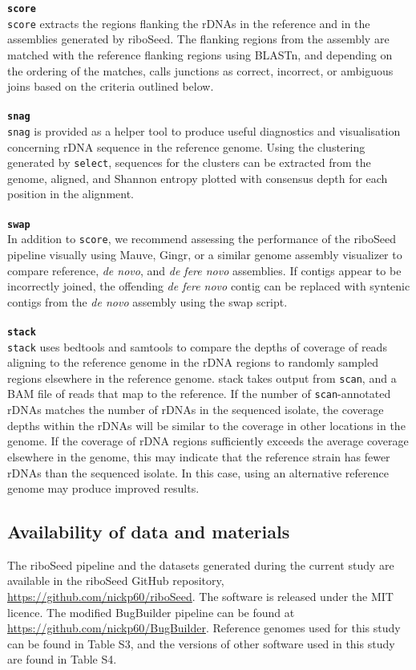 \documentclass[a4,center,fleqn]{NAR}
\begin{document}
\textbf{\texttt{score}}\\
\texttt{score} extracts the regions flanking the rDNAs in the reference and in the assemblies generated by riboSeed. The flanking regions from the assembly are matched with the reference flanking regions using BLASTn, and depending on the ordering of the matches, calls junctions as correct, incorrect, or ambiguous joins based on the criteria outlined below.\\
\\
\textbf{\texttt{snag}}\\
\texttt{snag} is provided as a helper tool to produce useful diagnostics and visualisation concerning rDNA sequence in the reference genome. Using the clustering generated by \texttt{select}, sequences for the clusters can be extracted from the genome, aligned, and Shannon entropy \cite{Schmitt1997} plotted with consensus depth for each position in the alignment.\\
\\
\textbf{\texttt{swap}}\\
In addition to \texttt{score}, we recommend assessing the performance of the riboSeed pipeline visually using Mauve\cite{Darling2004,Darling2011}, Gingr\cite{Treangen2014}, or a similar genome assembly visualizer to compare reference, \textit{de novo}, and \textit{de fere novo} assemblies. If contigs appear to be incorrectly joined, the offending \textit{de fere novo} contig can be replaced with syntenic contigs from the \textit{de novo} assembly using the swap script.\\
\\
\textbf{\texttt{stack}}\\
\texttt{stack} uses bedtools\cite{Quinlan2010} and samtools\cite{Li2009} to compare the depths of coverage of reads aligning to the reference genome in the rDNA regions to randomly sampled regions elsewhere in the reference genome. stack takes output from \texttt{scan}, and a BAM file of reads that map to the reference. If the number of \texttt{scan}-annotated rDNAs matches the number of rDNAs in the sequenced isolate, the coverage depths within the rDNAs will be similar to the coverage in other locations in the genome. If the coverage of rDNA regions sufficiently exceeds the average coverage elsewhere in the genome, this may indicate that the reference strain has fewer rDNAs than the sequenced isolate. In this case, using an alternative reference genome may produce improved results.

\subsection*{Availability of data and materials}
The riboSeed pipeline and the datasets generated during the current study are available in the riboSeed GitHub repository, \url{https://github.com/nickp60/riboSeed}. The software is released under the MIT licence.  The modified BugBuilder pipeline can be found at \url{https://github.com/nickp60/BugBuilder}. Reference genomes used for this study can be found in Table S3, and the versions of other software used in this study are found in Table S4.
\end{document}
